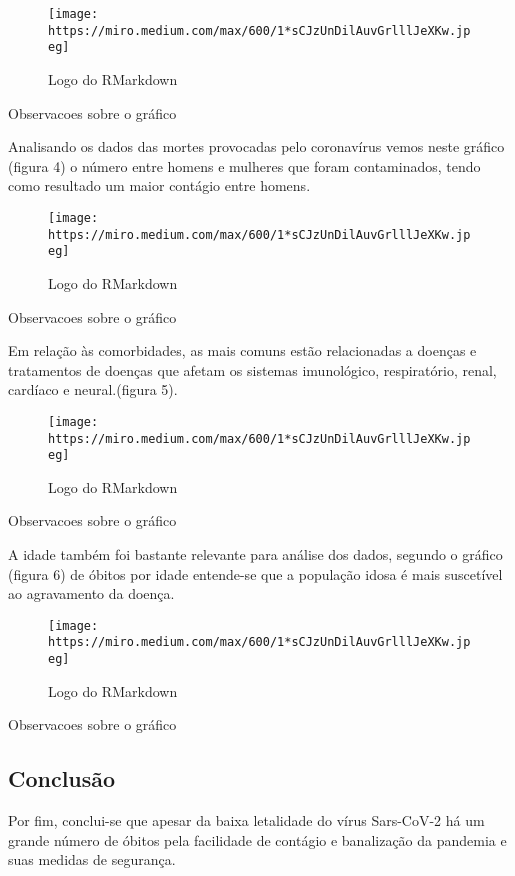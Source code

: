 \documentclass[
]{article}
\begin{document}
\begin{figure}
\centering
\texttt{[image: https://miro.medium.com/max/600/1*sCJzUnDilAuvGrlllJeXKw.jpeg]}
\caption{Logo do RMarkdown}
\end{figure}

Observacoes sobre o gráfico

Analisando os dados das mortes provocadas pelo coronavírus vemos neste
gráfico (figura 4) o número entre homens e mulheres que foram
contaminados, tendo como resultado um maior contágio entre homens.

\begin{figure}
\centering
\texttt{[image: https://miro.medium.com/max/600/1*sCJzUnDilAuvGrlllJeXKw.jpeg]}
\caption{Logo do RMarkdown}
\end{figure}

Observacoes sobre o gráfico

Em relação às comorbidades, as mais comuns estão relacionadas a doenças
e tratamentos de doenças que afetam os sistemas imunológico,
respiratório, renal, cardíaco e neural.(figura 5).

\begin{figure}
\centering
\texttt{[image: https://miro.medium.com/max/600/1*sCJzUnDilAuvGrlllJeXKw.jpeg]}
\caption{Logo do RMarkdown}
\end{figure}

Observacoes sobre o gráfico

A idade também foi bastante relevante para análise dos dados, segundo o
gráfico (figura 6) de óbitos por idade entende-se que a população idosa
é mais suscetível ao agravamento da doença.

\begin{figure}
\centering
\texttt{[image: https://miro.medium.com/max/600/1*sCJzUnDilAuvGrlllJeXKw.jpeg]}
\caption{Logo do RMarkdown}
\end{figure}

Observacoes sobre o gráfico

\hypertarget{conclusuxe3o}{%
\subsection{Conclusão}\label{conclusuxe3o}}

Por fim, conclui-se que apesar da baixa letalidade do vírus Sars-CoV-2
há um grande número de óbitos pela facilidade de contágio e banalização
da pandemia e suas medidas de segurança.
\end{document}
